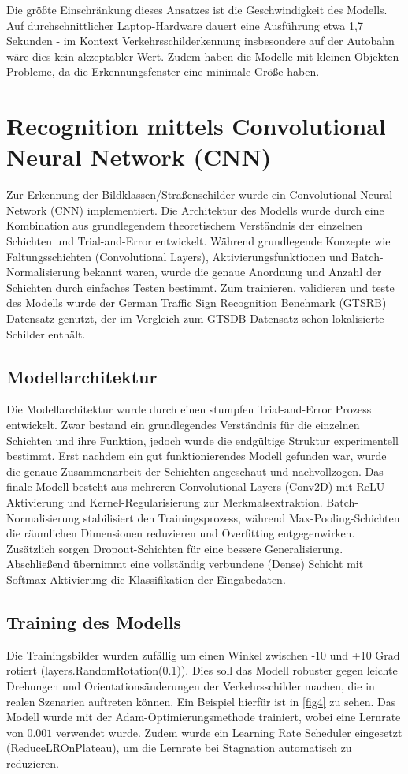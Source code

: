 \documentclass[runningheads]{llncs}
\begin{document}
Die größte Einschränkung dieses Ansatzes ist die Geschwindigkeit des Modells. Auf durchschnittlicher Laptop-Hardware dauert eine Ausführung etwa 1,7 Sekunden - im Kontext Verkehrsschilderkennung insbesondere auf der Autobahn wäre dies kein akzeptabler Wert. Zudem haben die Modelle mit kleinen Objekten Probleme, da die Erkennungsfenster eine minimale Größe haben.

\section{Recognition mittels Convolutional Neural Network (CNN)}
Zur Erkennung der Bildklassen/Straßenschilder wurde ein Convolutional Neural Network (CNN) implementiert. Die Architektur des Modells wurde
durch eine Kombination aus grundlegendem theoretischem Verständnis der einzelnen Schichten und Trial-and-Error entwickelt.
Während grundlegende Konzepte wie Faltungsschichten (Convolutional Layers), Aktivierungsfunktionen und Batch-Normalisierung
bekannt waren, wurde die genaue Anordnung und Anzahl der Schichten durch einfaches Testen bestimmt.
Zum trainieren, validieren und teste des Modells wurde der German Traffic Sign Recognition Benchmark (GTSRB) Datensatz genutzt, der
im Vergleich zum GTSDB Datensatz schon lokalisierte Schilder enthält.

\subsection{Modellarchitektur}
Die Modellarchitektur wurde durch einen stumpfen Trial-and-Error Prozess entwickelt. Zwar bestand ein grundlegendes Verständnis
für die einzelnen Schichten und ihre Funktion, jedoch wurde die endgültige Struktur experimentell bestimmt.
Erst nachdem ein gut funktionierendes Modell gefunden war, wurde die genaue Zusammenarbeit der Schichten angeschaut und
nachvollzogen. Das finale Modell besteht aus mehreren Convolutional Layers (Conv2D) mit ReLU-Aktivierung und Kernel-Regularisierung
zur Merkmalsextraktion. Batch-Normalisierung stabilisiert den Trainingsprozess, während Max-Pooling-Schichten die räumlichen
Dimensionen reduzieren und Overfitting entgegenwirken. Zusätzlich sorgen Dropout-Schichten für eine bessere Generalisierung.
Abschließend übernimmt eine vollständig verbundene (Dense) Schicht mit Softmax-Aktivierung die Klassifikation der Eingabedaten.

\subsection{Training des Modells}
Die Trainingsbilder wurden zufällig um einen Winkel zwischen -10 und +10 Grad rotiert (layers.RandomRotation(0.1)). Dies soll das Modell
robuster gegen leichte Drehungen und Orientationsänderungen der Verkehrsschilder machen, die in realen Szenarien auftreten können. Ein Beispiel
hierfür ist in \ref{fig4} zu sehen. Das Modell wurde mit der Adam-Optimierungsmethode trainiert, wobei eine Lernrate von $0.001$ verwendet wurde. Zudem wurde ein
Learning Rate Scheduler eingesetzt (ReduceLROnPlateau), um die Lernrate bei Stagnation automatisch zu reduzieren.
\end{document}

